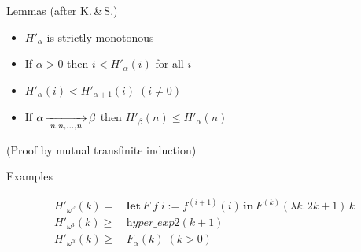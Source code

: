\documentclass[10pt, fleqn]{beamer}
\begin{document}
\begin{frame}[fragile]
  

\begin{block}{Lemmas (after K.\,\&\,S.)}
   \begin{itemize} 
    \item \textcolor{mathcolor}{$H'_\alpha$} is strictly monotonous
    
     \item  If $\alpha>0$ then \textcolor{mathcolor}{$ i < H'_\alpha(i)$} for all $i$
    
    \item   $H'_\alpha(i) < H'_{\alpha+1}(i) \; (i \not=0)$
    
       \item     If \textcolor{mathcolor}{$\alpha \rplus{n,n,\dots,n} \beta$} then \textcolor{mathcolor}{$H'_\beta(n)\leq H'_\alpha(n)$} 
         

       \end{itemize}
       (Proof by mutual transfinite induction)
 \end{block}  

 \begin{block}{Examples}
         
      {\color{mathcolor}
      
        \begin{align*}
        H'_{\omega^\omega}(k)=\,& \textbf{let}\,F\;f\;i := f^{(i+1)}(i)\,
                                  \textbf{in}\, F^{(k)}(\lambda k.\,2k+1)\,k\\
      H'_{\omega^3}(k) \geq\, & \textit{hyper\_exp2}(k+1) \\
      H'_{\omega^\alpha}(k)\geq\,& F_\alpha(k)\; (k>0)\\
    \end{align*}
       }%
  \end{block}
  
    
\end{frame}
 



\end{document}
